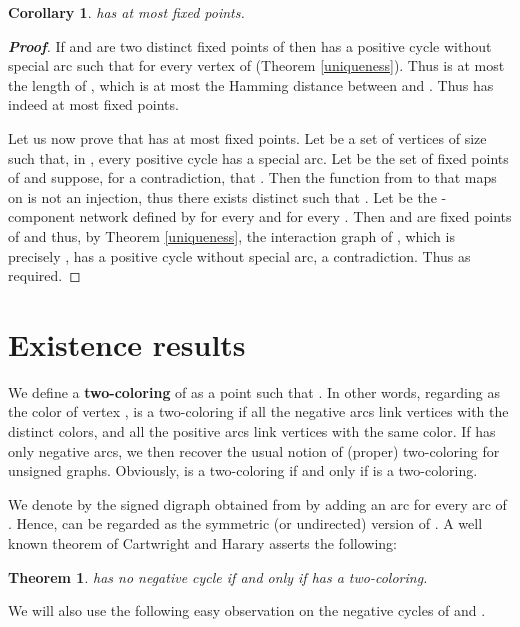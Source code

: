 \documentclass[11pt,a4paper]{article}
\newtheorem{corollary}{Corollary}
\newtheorem{theorem}{Theorem}
\begin{document}
\begin{corollary}\label{newupperbound}
 has at most  fixed points. 
\end{corollary} 


\begin{proof}[{\bf Proof}]
If  and  are two distinct fixed points of  then  has a positive cycle without special arc such that  for every vertex  of  (Theorem \ref{uniqueness}). Thus  is at most the length of , which is at most the Hamming distance between  and . Thus  has indeed at most  fixed points. 

\medskip
Let us now prove that  has at most  fixed points. Let  be a set of vertices of size  such that, in , every positive cycle has a special arc. Let  be the set of fixed points of  and suppose, for a contradiction, that . Then the function from  to  that maps  on  is not an injection, thus there exists distinct  such that . Let  be the -component network defined by  for every  and  for every . Then  and  are fixed points of  and thus, by Theorem  \ref{uniqueness}, the interaction graph of , which is precisely , has a positive cycle without special arc, a contradiction. Thus  as required. 
\end{proof}


\section{Existence results}\label{sec:existence}


We define a {\bf two-coloring} of  as a point  such that . In other words, regarding  as the color of vertex ,  is a two-coloring if all the negative arcs link vertices with the distinct colors, and all the positive arcs link vertices with the same color. If  has only negative arcs, we then recover the usual notion of (proper) two-coloring for unsigned graphs. Obviously,  is a two-coloring if and only if  is a two-coloring. 

\medskip
We denote by  the signed digraph obtained from  by adding an arc  for every arc  of . Hence,  can be regarded as the symmetric (or undirected) version of . A well known theorem of Cartwright and Harary \cite{CH56} asserts the following: 

\begin{theorem}\label{thm_Harary}
 has no negative cycle if and only if  has a two-coloring.
\end{theorem}

We will also use the following easy observation on the negative cycles of  and . 
\end{document}
